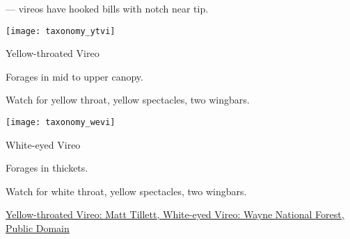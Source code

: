 \documentclass[t]{beamer}
\newcommand{\backoneline}{\vspace{-\baselineskip}}
\begin{document}
\begin{frame}{ — vireos have hooked bills with notch near tip.}
	
	\backoneline
	\begin{multicols}{2}
		
		\texttt{[image: taxonomy\_ytvi]}
		
		Yellow-throated Vireo
		
		\medskip
		
		Forages in mid to upper canopy.
		
		\smallskip
		
		Watch for yellow throat, yellow spectacles, two wingbars.
				
		\columnbreak
		
		\texttt{[image: taxonomy\_wevi]}
		
		White-eyed Vireo
		
		\medskip
		
		Forages in thickets.
		
		\smallskip
		
		Watch for white throat, yellow spectacles, two wingbars.
		
	\end{multicols}
	
	\vfilll
	
	\tiny  \href{https://flickr.com/photos/mattyfioner/4996456327}{Yellow-throated Vireo: Matt Tillett, } \hfill  \href{https://flickr.com/photos/waynenf/52315407133}{White-eyed Vireo: Wayne National Forest, Public Domain}
	
\end{frame}
\end{document}
